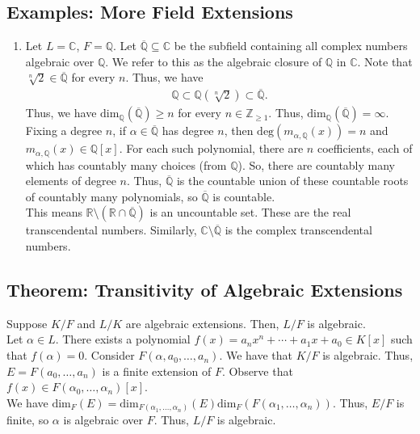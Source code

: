\documentclass[10pt]{extarticle}
\newcommand{\Q}{\mathbb{Q}}
\newcommand{\Z}{\mathbb{Z}}
\newcommand{\R}{\mathbb{R}}
\newcommand{\C}{\mathbb{C}}
\begin{document}
  \subsection{Examples: More Field Extensions}%
  \begin{enumerate}[(1)]
    \item Let $L = \C$, $F = \Q$. Let $\overline{\Q} \subseteq \C$ be the subfield containing all complex numbers algebraic over $\Q$. We refer to this as the algebraic closure of $\Q$ in $\C$. Note that $\sqrt[n]{2}\in \overline{\Q}$ for every $n$. Thus, we have
      \begin{align*}
        \Q \subset \Q(\sqrt[n]{2}) \subset \overline{\Q}.
      \end{align*}
      Thus, we have $\text{dim}_{\Q}(\overline{\Q}) \geq n$ for every $n\in \Z_{\geq 1}$. Thus, $\text{dim}_{\Q}(\overline{\Q}) = \infty$.\\

      Fixing a degree $n$, if $\alpha \in \overline{\Q}$ has degree $n$, then $\text{deg}\left(m_{\alpha,\Q}(x)\right) = n$ and $m_{\alpha,\Q}(x)\in \Q[x]$. For each such polynomial, there are $n$ coefficients, each of which has countably many choices (from $\Q$). So, there are countably many elements of degree $n$. Thus, $\overline{\Q}$ is the countable union of these countable roots of countably many polynomials, so $\overline{\Q}$ is countable.\\

      This means $\R\setminus (\R\cap \overline{\Q})$ is an uncountable set. These are the real transcendental numbers. Similarly, $\C\setminus \overline{\Q}$ is the complex transcendental numbers.
  \end{enumerate}
  \subsection{Theorem: Transitivity of Algebraic Extensions}%
  Suppose $K/F$ and $L/K$ are algebraic extensions. Then, $L/F$ is algebraic.\\

  Let $\alpha \in L$. There exists a polynomial $f(x) = a_nx^n + \cdots + a_1x + a_0\in K[x]$ such that $f(\alpha) = 0$. Consider $F(\alpha,a_0,\dots,a_n)$. We have that $K/F$ is algebraic. Thus, $E = F(a_0,\dots,a_n)$ is a finite extension of $F$. Observe that $f(x) \in F(\alpha_0,\dots,\alpha_n)[x]$.\\

  We have $\text{dim}_{F}(E) = \text{dim}_{F(\alpha_1,\dots,\alpha_n)}(E)\text{dim}_{F}(F(\alpha_1,\dots,\alpha_n))$. Thus, $E/F$ is finite, so $\alpha$ is algebraic over $F$. Thus, $L/F$ is algebraic.
\end{document}
